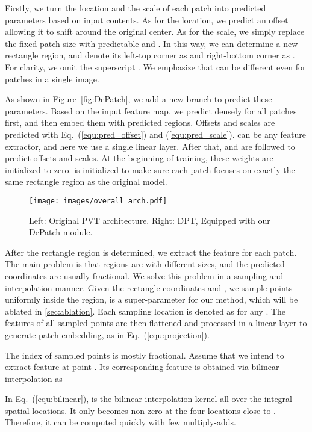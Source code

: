 \documentclass[sigconf,screen]{acmart}
\begin{document}
Firstly, we turn the location and the scale of each patch into predicted parameters based on input contents. As for the location, we predict an offset  allowing it to shift around the original center. As for the scale, we simply replace the fixed patch size  with predictable  and . In this way, we can determine a new rectangle region, and denote its left-top corner as  and right-bottom corner as . For clarity, we omit the superscript . We emphasize that  can be different even for patches in a single image.


As shown in Figure~\ref{fig:DePatch}, we add a new branch to predict these parameters. Based on the input feature map, we predict  densely for all patches first, and then embed them with predicted regions. Offsets and scales are predicted with Eq.~(\ref{equ:pred_offset}) and (\ref{equ:pred_scale}).  can be any feature extractor, and here we use a single linear layer. After that,  and  are followed to predict offsets and scales. At the beginning of training, these weights are initialized to zero.  is initialized to make sure each patch focuses on exactly the same rectangle region as the original model.


\begin{figure}[h]
  \centering
  \texttt{[image: images/overall\_arch.pdf]}
  \caption{Left: Original PVT architecture. Right: DPT, Equipped with our DePatch module.}
  \label{fig:overall_arch}
\end{figure}

After the rectangle region is determined, we extract the feature for each patch. The main problem is that regions are with different sizes, and the predicted coordinates are usually fractional. We solve this problem in a sampling-and-interpolation manner. Given the rectangle coordinates  and , we sample  points uniformly inside the region,  is a super-parameter for our method, which will be ablated in \ref{sec:ablation}. Each sampling location is denoted as  for any . The features of all sampled points  are then flattened and processed in a linear layer to generate patch embedding, as in Eq.~(\ref{equ:projection}).


The index of sampled points is mostly fractional. Assume that we intend to extract feature at point . Its corresponding feature is obtained via bilinear interpolation as



In Eq.~(\ref{equ:bilinear}),  is the bilinear interpolation kernel all over the integral spatial locations. It only becomes non-zero at the four locations close to . Therefore, it can be computed quickly with few multiply-adds.
\end{document}
